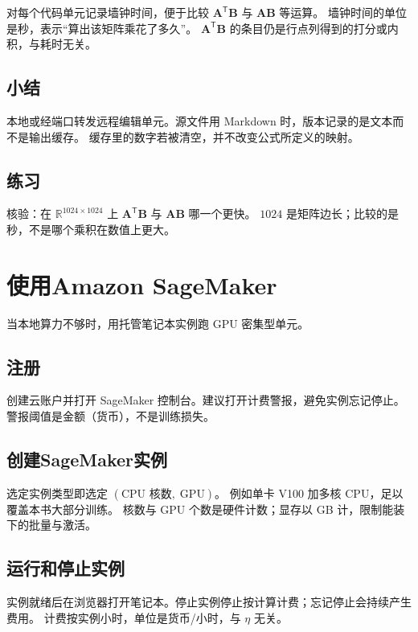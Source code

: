 对每个代码单元记录墙钟时间，便于比较 $\bm{A}^{\mathsf T}\bm{B}$ 与 $\bm{A}\bm{B}$ 等运算。
墙钟时间的单位是秒，表示“算出该矩阵乘花了多久”。
$\bm{A}^{\mathsf T}\bm{B}$ 的条目仍是行点列得到的打分或内积，与耗时无关。

\subsection{小结}

本地或经端口转发远程编辑单元。源文件用 Markdown 时，版本记录的是文本而不是输出缓存。
缓存里的数字若被清空，并不改变公式所定义的映射。

\subsection{练习}

核验：在 $\mathbb{R}^{1024\times 1024}$ 上 $\bm{A}^{\mathsf T}\bm{B}$ 与 $\bm{A}\bm{B}$ 哪一个更快。
$1024$ 是矩阵边长；比较的是秒，不是哪个乘积在数值上更大。

\section{使用Amazon SageMaker}

当本地算力不够时，用托管笔记本实例跑 GPU 密集型单元。

\subsection{注册}

创建云账户并打开 SageMaker 控制台。建议打开计费警报，避免实例忘记停止。
警报阈值是金额（货币），不是训练损失。

\subsection{创建SageMaker实例}

选定实例类型即选定 $(\text{CPU 核数},\;\mathrm{GPU})$。
例如单卡 V100 加多核 CPU，足以覆盖本书大部分训练。
核数与 GPU 个数是硬件计数；显存以 GB 计，限制能装下的批量与激活。

\subsection{运行和停止实例}

实例就绪后在浏览器打开笔记本。停止实例停止按计算计费；忘记停止会持续产生费用。
计费按实例小时，单位是货币/小时，与 $\eta$ 无关。

